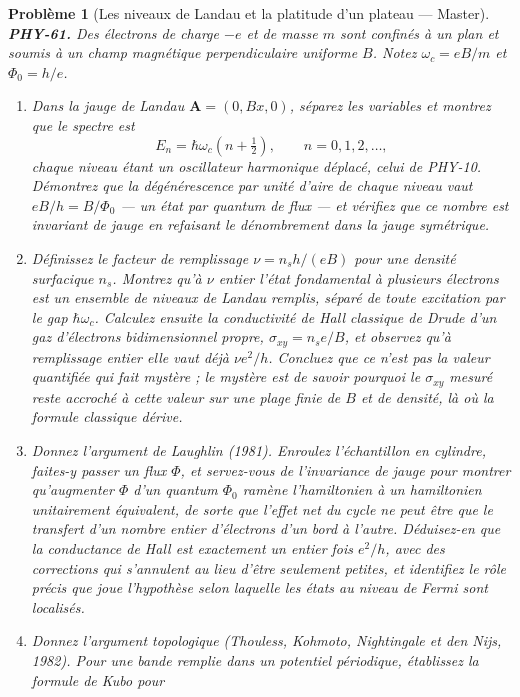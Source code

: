 \documentclass[11pt]{article}
\newtheorem{problem}{Problème}
\begin{document}
\begin{problem}[{Les niveaux de Landau et la platitude d'un plateau --- Master}]
\textbf{PHY-61.} Des électrons de charge $ -e $ et de masse $ m $ sont confinés à un plan
et soumis à un champ magnétique perpendiculaire uniforme $ B $. Notez $ \omega_{c} = eB/m $ et
$ \Phi_{0} = h/e $.
\begin{enumerate}
\item[(a)] Dans la jauge de Landau $ \mathbf{A} = (0, Bx, 0) $, séparez les variables et montrez que le
spectre est
\[ E_{n} = \hbar\omega_{c}\left(n+\tfrac{1}{2}\right), \qquad n = 0,1,2,\dots, \]
chaque niveau étant un oscillateur harmonique déplacé, celui de PHY-10. Démontrez que la
dégénérescence par unité d'aire de chaque niveau vaut $ eB/h = B/\Phi_{0} $ --- un état par
quantum de flux --- et vérifiez que ce nombre est invariant de jauge en refaisant le dénombrement
dans la jauge symétrique.
\item[(b)] Définissez le facteur de remplissage $ \nu = n_{s}h/(eB) $ pour une densité surfacique
$ n_{s} $. Montrez qu'à $ \nu $ entier l'état fondamental à plusieurs électrons est un
ensemble de niveaux de Landau remplis, séparé de toute excitation par le gap
$ \hbar\omega_{c} $. Calculez ensuite la conductivité de Hall \textit{classique} de Drude d'un gaz
d'électrons bidimensionnel propre, $ \sigma_{xy} = n_{s}e/B $, et observez qu'à remplissage
entier elle vaut déjà $ \nu e^{2}/h $. Concluez que ce n'est pas la \textit{valeur} quantifiée qui
fait mystère ; le mystère est de savoir pourquoi le $ \sigma_{xy} $ mesuré reste accroché à
cette valeur sur une plage finie de $ B $ et de densité, là où la formule classique
dérive.
\item[(c)] Donnez l'argument de Laughlin (1981). Enroulez l'échantillon en cylindre, faites-y passer un
flux $ \Phi $, et servez-vous de l'invariance de jauge pour montrer qu'augmenter $ \Phi $ d'un
quantum $ \Phi_{0} $ ramène l'hamiltonien à un hamiltonien unitairement équivalent, de sorte que
l'effet net du cycle ne peut être que le transfert d'un nombre entier d'électrons d'un bord à
l'autre. Déduisez-en que la conductance de Hall est exactement un entier fois $ e^{2}/h $, avec
des corrections qui s'annulent au lieu d'être seulement petites, et identifiez le rôle précis que
joue l'hypothèse selon laquelle les états au niveau de Fermi sont localisés.
\item[(d)] Donnez l'argument topologique (Thouless, Kohmoto, Nightingale et den Nijs, 1982). Pour une
bande remplie dans un potentiel périodique, établissez la formule de Kubo pour

\end{enumerate}
\end{problem}
\end{document}
